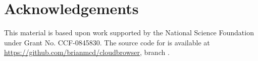 \section{Acknowledgements}
\label{sec:ack}

This material is based upon work supported by the 
National Science Foundation under Grant No. CCF-0845830.
The source code for \cbtwo is available at \url{https://github.com/brianmcd/cloudbrowser},
branch .


